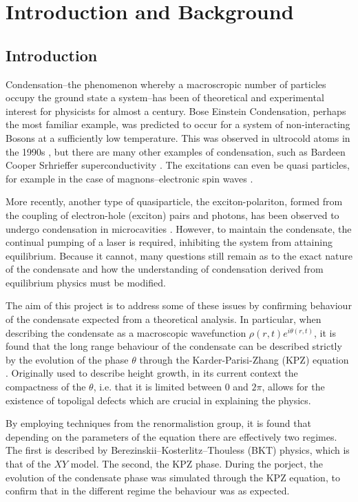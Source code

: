 \chapter{Introduction and Background}

\section{Introduction}

Condensation--the phenomenon whereby a macroscropic number of particles occupy the ground state a system--has been of theoretical and experimental interest for physicists for almost a century. Bose Einstein Condensation, perhaps the most familiar example, was predicted to occur for a system of non-interacting Bosons at a sufficiently low temperature. This was observed in ultrocold atoms in the 1990s \cite{PhysRevLett.75.3969}, but there are many other examples of condensation, such as Bardeen Cooper Srhrieffer superconductivity \cite{PhysRev.108.1175}. The excitations can even be quasi particles, for example in the case of magnons--electronic spin waves \cite{magnon}.

More recently, another type of quasiparticle, the exciton-polariton, formed from the coupling of electron-hole (exciton) pairs and photons, has been observed to undergo condensation in microcavities \cite{Byrnes2014}. However, to maintain the condensate, the continual pumping of a laser is required, inhibiting the system from attaining equilibrium. Because it cannot, many questions still remain as to the exact nature of the condensate and how the understanding of condensation derived from equilibrium physics must be modified. 

The aim of this project is to address some of these issues by confirming behaviour of the condensate expected from a theoretical analysis. In particular, when describing the condensate as a macroscopic wavefunction $\rho(r,t)e^{i\theta(r,t)}$, it is found that the long range behaviour of the condensate can be described strictly by the evolution of the phase $\theta$ through the Karder-Parisi-Zhang (KPZ) equation \cite{PhysRevX.7.041006,2015PhRvX...5a1017A}. Originally used to describe height growth\cite{PhysRevLett.56.889}, in its current context the compactness of the $\theta$, i.e. that it is limited between $0$ and $2\pi$, allows for the existence of topoligal defects which are crucial in explaining the physics.

By employing techniques from the renormalistion group, it is found that depending on the parameters of the equation there are effectively two regimes. The first is described by Berezinskii–Kosterlitz–Thouless (BKT) physics, which is that of the $XY$ model. The second, the KPZ phase. 
During the porject, the evolution of the condensate phase was simulated through the KPZ equation, to confirm that in the different regime the behaviour was as expected. 


